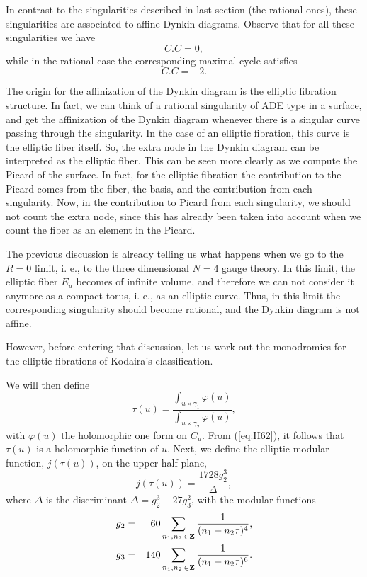   
In contrast to the singularities described in last section (the
rational ones), these singularities are associated to affine
Dynkin diagrams. Observe that for all these singularities we have 
\begin{equation}
C.C =0,
\end{equation}
while in the rational case the corresponding maximal cycle
satisfies 
\begin{equation}
C.C=-2.
\end{equation}
  
The origin for the affinization of the Dynkin diagram is the
elliptic fibration structure. In fact, we can think of a rational
singularity of ADE type in a surface, and get the affinization of
the Dynkin diagram whenever there is a singular curve passing
through the singularity. In the case of an elliptic fibration,
this curve is the elliptic fiber itself. So, the extra node in
the Dynkin diagram can be interpreted as the elliptic fiber. This
can be seen more clearly as we compute the Picard of the surface.
In fact, for the elliptic fibration the contribution to the
Picard comes from the fiber, the basis, and the contribution from
each singularity. Now, in the contribution to Picard from each
singularity, we should not count the extra node, since this has
already been taken into account when we count the fiber as an
element in the Picard.
  
The previous discussion is already telling us what happens when
we go to the $R=0$ limit, i. e., to the three dimensional $N=4$
gauge theory. In this limit, the elliptic fiber $E_u$ becomes of
infinite volume, and therefore we can not consider it anymore as
a compact torus, i. e., as an elliptic curve. Thus, in this limit
the corresponding singularity should become rational, and the
Dynkin diagram is not affine.
  
However, before entering that discussion, let us work out the
monodromies for the elliptic fibrations of Kodaira's
classification.
  
 
We will then define
\begin{equation}
\tau(u) = \frac {\int_{u \times \gamma_1} \varphi(u)}{\int_{u
\times \gamma_2} \varphi(u)},
\label{eq:II62}
\end{equation}
with $\varphi(u)$ the holomorphic one form on $C_u$. From
(\ref{eq:II62}), it follows that $\tau(u)$ is a holomorphic
function of $u$. Next, we define the elliptic modular function,
$j(\tau(u))$, on the upper half plane,
\begin{equation}
j(\tau(u)) = \frac {1728 g_2^3}{\Delta},
\label{eq:II63}
\end{equation}
where $\Delta$ is the discriminant $\Delta=g_2^3-27g_3^2$, with
the modular functions
\begin{eqnarray}
g_2 & = & 60 \sum_{n_1,n_2 \: \in {\bf Z}} \frac {1}{(n_1+n_2
\tau)^4}, \nonumber \\
g_3 & = & 140 \sum_{n_1,n_2 \: \in {\bf Z}} \frac {1}{(n_1+n_2
\tau)^6}.
\label{eq:II64}
\end{eqnarray}
  
